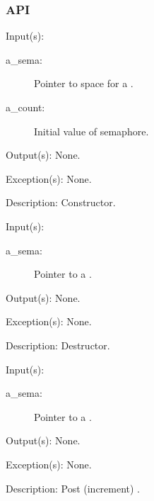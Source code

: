 \subsubsection{API}
\begin{capi}
\label{sema_new}
	\begin{capilist}
	\item[Input(s): ]
		\begin{description}\item[]
		\item[a\_sema: ]
			Pointer to space for a .
		\item[a\_count: ]
			Initial value of semaphore.
		\end{description}
	\item[Output(s): ] None.
	\item[Exception(s): ] None.
	\item[Description: ]
		Constructor.
	\end{capilist}
\label{sema_delete}
	\begin{capilist}
	\item[Input(s): ]
		\begin{description}\item[]
		\item[a\_sema: ]
			Pointer to a \classname{sema}.
		\end{description}
	\item[Output(s): ] None.
	\item[Exception(s): ] None.
	\item[Description: ]
		Destructor.
	\end{capilist}
\label{sema_post}
	\begin{capilist}
	\item[Input(s): ]
		\begin{description}\item[]
		\item[a\_sema: ]
			Pointer to a .
		\end{description}
	\item[Output(s): ] None.
	\item[Exception(s): ] None.
	\item[Description: ]
		Post (increment) \cvar{a\_sema}.
	\end{capilist}

\end{capi}
